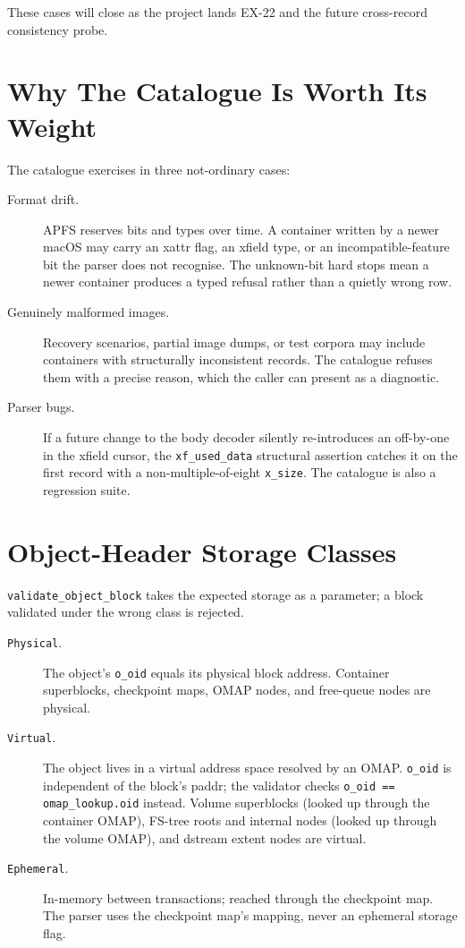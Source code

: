 These cases will close as the project lands EX-22 and the future
cross-record consistency probe.

\section{Why The Catalogue Is Worth Its Weight}

The catalogue exercises in three not-ordinary cases:

\begin{description}
  \item[Format drift.] APFS reserves bits and types over time. A
    container written by a newer macOS may carry an xattr flag, an
    xfield type, or an incompatible-feature bit the parser does not
    recognise. The unknown-bit hard stops mean a newer container
    produces a typed refusal rather than a quietly wrong row.
  \item[Genuinely malformed images.] Recovery scenarios, partial
    image dumps, or test corpora may include containers with
    structurally inconsistent records. The catalogue refuses them
    with a precise reason, which the caller can present as a
    diagnostic.
  \item[Parser bugs.] If a future change to the body decoder
    silently re-introduces an off-by-one in the xfield cursor, the
    \texttt{xf\_used\_data} structural assertion catches it on the
    first record with a non-multiple-of-eight \texttt{x\_size}. The
    catalogue is also a regression suite.
\end{description}

\section{Object-Header Storage Classes}

\texttt{validate\_object\_block} takes the expected storage as a
parameter; a block validated under the wrong class is rejected.

\begin{description}
  \item[\texttt{Physical}.] The object's \texttt{o\_oid} equals its
    physical block address. Container superblocks, checkpoint maps,
    OMAP nodes, and free-queue nodes are physical.
  \item[\texttt{Virtual}.] The object lives in a virtual address
    space resolved by an OMAP. \texttt{o\_oid} is independent of the
    block's paddr; the validator checks
    \texttt{o\_oid == omap\_lookup.oid} instead. Volume superblocks
    (looked up through the container OMAP), FS-tree roots and
    internal nodes (looked up through the volume OMAP), and dstream
    extent nodes are virtual.
  \item[\texttt{Ephemeral}.] In-memory between transactions; reached
    through the checkpoint map. The parser uses the checkpoint map's
    mapping, never an ephemeral storage flag.
\end{description}


